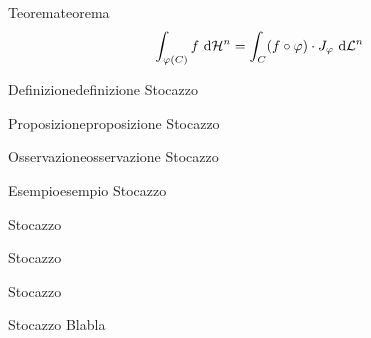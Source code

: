 \documentclass{article}
\begin{document}
\begin{theorem}{Teorema}{teorema}
    \[\int_{\varphi(C)} f \text{ d} \mathcal{H}^n = \int_{C} (f\circ \varphi) \cdot J_\varphi \text{ d} \mathcal{L}^n\]
\end{theorem}

\begin{definition}{Definizione}{definizione}
    Stocazzo
\end{definition}

\begin{proposition}{Proposizione}{proposizione}
    Stocazzo
\end{proposition}

\begin{remark}{Osservazione}{osservazione}
    Stocazzo
\end{remark}

\begin{example}{Esempio}{esempio}
    Stocazzo
\end{example}

\begin{notation}
    Stocazzo
\end{notation}

\begin{lemma}{}{}
    Stocazzo
\end{lemma}

\begin{corollary}{}{}
    Stocazzo
\end{corollary}

\begin{Ptheorem}{}{}
    Stocazzo
    \proof
    Blabla
\end{Ptheorem}
\end{document}
